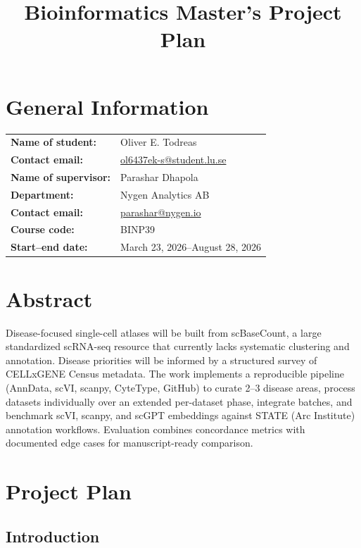 \documentclass[12pt,a4paper]{article}
\title{\textbf{Bioinformatics Master's Project Plan}}
\date{}
\begin{document}
\maketitle

\section*{General Information}

\begin{tabular}{@{}ll}
    \textbf{Name of student:}      & Oliver E. Todreas \\
    \textbf{Contact email:}        & \href{mailto:ol6437ek-s@student.lu.se}{ol6437ek-s@student.lu.se} \\
    \textbf{Name of supervisor:}   & Parashar Dhapola \\
    \textbf{Department:}      & Nygen Analytics AB \\
    \textbf{Contact email:}        & \href{mailto:parashar@nygen.io}{parashar@nygen.io} \\
    \textbf{Course code:}          & BINP39 \\
    \textbf{Start–end date:}    & March 23, 2026–August 28, 2026 \\
\end{tabular}

\section*{Abstract}

Disease-focused single-cell atlases will be built from scBaseCount, a large standardized scRNA-seq resource that currently lacks systematic clustering and annotation. Disease priorities will be informed by a structured survey of CELLxGENE Census metadata. The work implements a reproducible pipeline (AnnData, scVI, scanpy, CyteType, GitHub) to curate 2–3 disease areas, process datasets individually over an extended per-dataset phase, integrate batches, and benchmark scVI, scanpy, and scGPT embeddings against STATE (Arc Institute) annotation workflows. Evaluation combines concordance metrics with documented edge cases for manuscript-ready comparison.

\section*{Project Plan}

\subsection*{Introduction}
\end{document}

